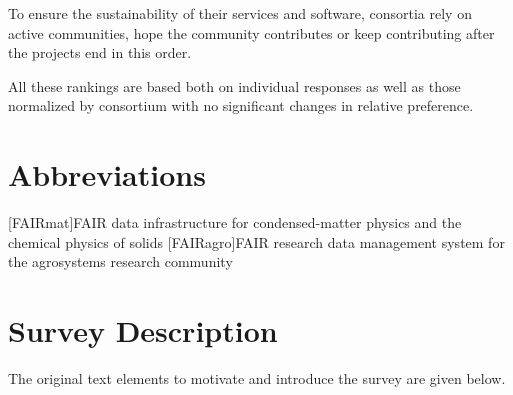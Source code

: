 \documentclass[headsepline,titlepage,twoside,12pt,toc=flat,headings=normal]{scrreprt}
\begin{document}
To ensure the sustainability of their services and software, consortia rely on active communities, hope the community contributes or keep contributing after the projects end in this order.

All these rankings are based both on individual responses as well as those normalized by consortium with no significant changes in relative preference.


\chapter*{Abbreviations}%

\begin{acronym}
[FAIRmat]{FAIR data infrastructure for condensed-matter physics and the chemical physics of solids}
[FAIRagro]{FAIR research data management system for the agrosystems research community}
\end{acronym}

\setcounter{tocdepth}{1}%
\tableofcontents
{}
\listoffigures
{}
\begingroup
\let\clearpage\relax
\listoftables
\endgroup
{}


\chapter{Survey Description}\label{ch:questionnaire}
The original text elements to motivate and introduce the survey are given below.
\end{document}
